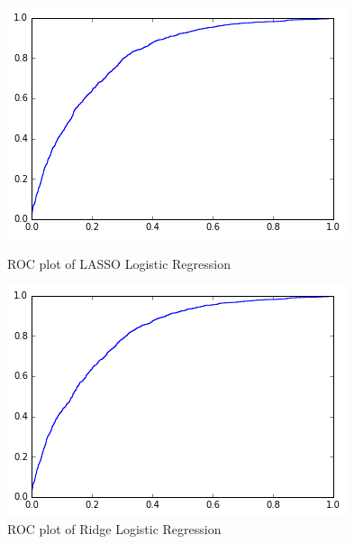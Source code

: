 \documentclass[11pt]{article}
\begin{document}
\begin{figure}[!ht]
\centering
\begin{minipage}{.5\textwidth}
  \centering
  \includegraphics[width=.8\linewidth]{lasso_lr_roc.png}
  \caption{ROC plot of LASSO Logistic Regression}
\end{minipage}%
\begin{minipage}{.5\textwidth}
  \centering
  \includegraphics[width=.8\linewidth]{ridge_lr_roc.png}
  \caption{ROC plot of Ridge Logistic Regression}
\end{minipage}%


\end{figure}
\end{document}
